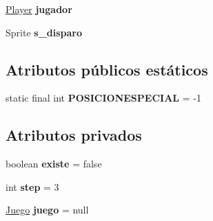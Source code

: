 \begin{DoxyCompactItemize}
\item 
\hypertarget{classBatallaEspacial_1_1DisparoJugador_a252a6e9906aed6fd89d3f4e06e409bd8}{
\hyperlink{classBatallaEspacial_1_1Player}{Player} {\bfseries jugador}}
\label{classBatallaEspacial_1_1DisparoJugador_a252a6e9906aed6fd89d3f4e06e409bd8}

\item 
\hypertarget{classBatallaEspacial_1_1DisparoJugador_a53a596f3517f05acda954448e710f6de}{
Sprite {\bfseries s\_\-disparo}}
\label{classBatallaEspacial_1_1DisparoJugador_a53a596f3517f05acda954448e710f6de}

\end{DoxyCompactItemize}
\subsection*{Atributos públicos estáticos}
\begin{DoxyCompactItemize}
\item 
\hypertarget{classBatallaEspacial_1_1DisparoJugador_acb151cf2b3133d432fe44a9d73914f0f}{
static final int {\bfseries POSICIONESPECIAL} = -\/1}
\label{classBatallaEspacial_1_1DisparoJugador_acb151cf2b3133d432fe44a9d73914f0f}

\end{DoxyCompactItemize}
\subsection*{Atributos privados}
\begin{DoxyCompactItemize}
\item 
\hypertarget{classBatallaEspacial_1_1DisparoJugador_a3edc8dc224d3cb2a47dedb37540acdc8}{
boolean {\bfseries existe} = false}
\label{classBatallaEspacial_1_1DisparoJugador_a3edc8dc224d3cb2a47dedb37540acdc8}

\item 
\hypertarget{classBatallaEspacial_1_1DisparoJugador_a113b2564f259acc42d47e13819623c09}{
int {\bfseries step} = 3}
\label{classBatallaEspacial_1_1DisparoJugador_a113b2564f259acc42d47e13819623c09}

\item 
\hypertarget{classBatallaEspacial_1_1DisparoJugador_afff63e81b4bbf1a045b288913f8797f4}{
\hyperlink{classBatallaEspacial_1_1Juego}{Juego} {\bfseries juego} = null}
\label{classBatallaEspacial_1_1DisparoJugador_afff63e81b4bbf1a045b288913f8797f4}

\end{DoxyCompactItemize}


